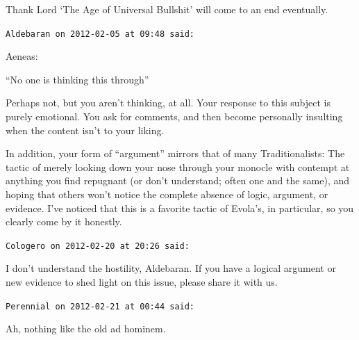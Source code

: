 \begin{footnotesize}
\begin{sffamily}
Thank Lord `The Age of Universal Bullshit' will come to an end eventually.

\hfill

\texttt{Aldebaran on 2012-02-05 at 09:48 said:}

Aeneas:

``No one is thinking this through''

Perhaps not, but you aren't thinking, at all. Your response to this subject is purely emotional. You ask for comments, and then become personally insulting when the content isn't to your liking.

In addition, your form of ``argument'' mirrors that of many Traditionalists: The tactic of merely looking down your nose through your monocle with contempt at anything you find repugnant (or don't understand; often one and the same), and hoping that others won't notice the complete absence of logic, argument, or evidence. I've noticed that this is a favorite tactic of Evola's, in particular, so you clearly come by it honestly.

\hfill

\texttt{Cologero on 2012-02-20 at 20:26 said:}

I don't understand the hostility, Aldebaran. If you have a logical argument or new evidence to shed light on this issue, please share it with us.

\hfill

\texttt{Perennial on 2012-02-21 at 00:44 said:}

Ah, nothing like the old ad hominem.


\hfill

\end{sffamily}
\end{footnotesize}

